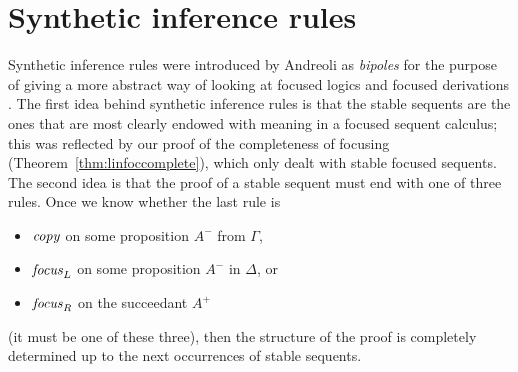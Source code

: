 \section{Synthetic inference rules}
\label{sec:linsynthetic}

Synthetic inference rules were introduced by Andreoli as {\it bipoles}
for the purpose of giving a more abstract way of looking at focused
logics and focused derivations \cite{andreoli01focussing}. The first
idea behind synthetic inference rules is that the stable
sequents are the ones that are most clearly endowed with meaning in a
focused sequent calculus; this was reflected by our proof of the
completeness of focusing
(Theorem~\ref{thm:linfoccomplete}), which only dealt with
stable focused sequents. The second idea is that the proof of
a stable sequent must end with one of three rules. Once we know 
whether the last rule is
\begin{itemize}
\item ${\it copy}$ on some proposition $A^-$ from $\Gamma$, 
\item ${\it focus}_L$ on some proposition $A^-$ in $\Delta$, or
\item ${\it focus}_R$ on the succeedant $A^+$
\end{itemize} (it must be one of these
three), then the structure of the proof is completely determined
up to the next occurrences of stable sequents. 

